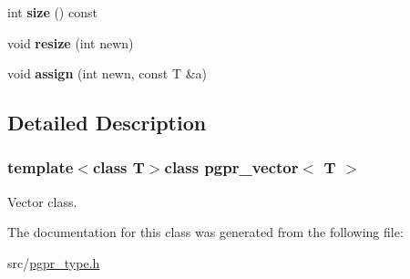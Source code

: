 \begin{DoxyCompactItemize}
\item 
\hypertarget{classpgpr__vector_ac0674ee93caf2192637931f035aa5311}{int {\bfseries size} () const }\label{classpgpr__vector_ac0674ee93caf2192637931f035aa5311}

\item 
\hypertarget{classpgpr__vector_a0739a665c8294cc5a954f08d12ee0c3e}{void {\bfseries resize} (int newn)}\label{classpgpr__vector_a0739a665c8294cc5a954f08d12ee0c3e}

\item 
\hypertarget{classpgpr__vector_a3797b9b7f54060498c7a0fd4e2e2f6be}{void {\bfseries assign} (int newn, const T \&a)}\label{classpgpr__vector_a3797b9b7f54060498c7a0fd4e2e2f6be}

\end{DoxyCompactItemize}


\subsection{Detailed Description}
\subsubsection*{template$<$class T$>$class pgpr\+\_\+vector$<$ T $>$}

Vector class. 

The documentation for this class was generated from the following file\+:\begin{DoxyCompactItemize}
\item 
src/\hyperlink{pgpr__type_8h}{pgpr\+\_\+type.\+h}\end{DoxyCompactItemize}
